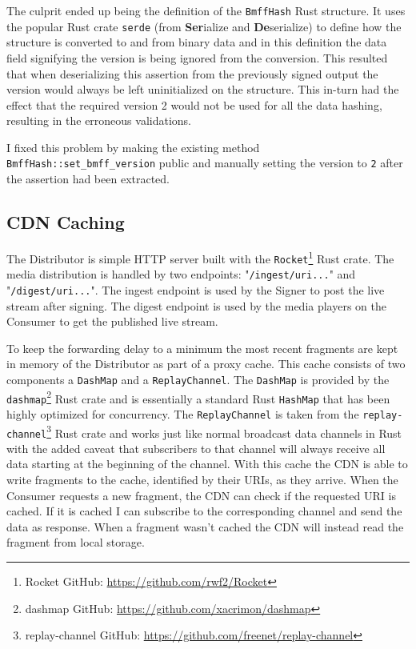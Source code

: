 The culprit ended up being the definition of the \texttt{BmffHash} Rust structure. It uses the popular Rust crate \texttt{serde} (from \textbf{Ser}ialize and \textbf{De}serialize) to define how the structure is converted to and from binary data and in this definition the data field signifying the version is being ignored from the conversion. This resulted that when deserializing this assertion from the previously signed output the version would always be left uninitialized on the structure. This in-turn had the effect that the required version 2 would not be used for all the data hashing, resulting in the erroneous validations.

I fixed this problem by making the existing method \texttt{BmffHash::set\_bmff\_version} public and manually setting the version to \texttt{2} after the assertion had been extracted.

\subsection{CDN Caching\label{sec:caching}}

The Distributor is simple HTTP server built with the \texttt{Rocket}\footnote{Rocket GitHub: \url{https://github.com/rwf2/Rocket}} Rust crate. The media distribution is handled by two endpoints: "\texttt{/ingest/uri...}" and "\texttt{/digest/uri...}". The ingest endpoint is used by the Signer to post the live stream after signing. The digest endpoint is used by the media players on the Consumer to get the published live stream.

To keep the forwarding delay to a minimum the most recent fragments are kept in memory of the Distributor as part of a proxy cache. This cache consists of two components a \texttt{DashMap} and a \texttt{ReplayChannel}. The \texttt{DashMap} is provided by the \texttt{dashmap}\footnote{dashmap GitHub: \url{https://github.com/xacrimon/dashmap}} Rust crate and is essentially a standard Rust \texttt{HashMap} that has been highly optimized for concurrency. The \texttt{ReplayChannel} is taken from the \texttt{replay-channel}\footnote{replay-channel GitHub: \url{https://github.com/freenet/replay-channel}} Rust crate and works just like normal broadcast data channels in Rust with the added caveat that subscribers to that channel will always receive all data starting at the beginning of the channel. With this cache the CDN is able to write fragments to the cache, identified by their URIs, as they arrive. When the Consumer requests a new fragment, the CDN can check if the requested URI is cached. If it is cached I can subscribe to the corresponding channel and send the data as response. When a fragment wasn't cached the CDN will instead read the fragment from local storage.

